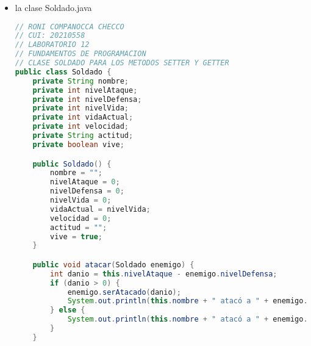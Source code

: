 \documentclass{article}
\begin{document}
\begin{itemize}
\begin{itemize}
\begin{lstlisting}[language=java]
    // METODO QUE NOS AYUDA A ORDENAR LOS SOLDADOS DE ACUERDO A SU NIVEL DE VIDA, USUANDO UN ALGORITMO DE ORDENAMIENTO DE BURBUJA
    public static void ordenarPorVidaMetodoA(ArrayList<Soldado> soldadito) {
        Soldado aux = new Soldado();
        for (int i = 0; i < soldadito.size() - 1; i++) {
            for (int j = 0; j < soldadito.size() - i - 1; j++) {
                if (soldadito.get(j).getNivelVida() < soldadito.get(j + 1).getNivelVida()) {
                    aux = soldadito.get(j);
                    soldadito.set(j, soldadito.get(j + 1));
                    soldadito.set(j + 1, aux);
                }
            }
        }
    }

    // METODO QUE NOS AYUDA A ORDENAR LOS SOLDADOS DE ACUERDO A SU NIVEL DE VIDA, EN ESTA OCACION DIFERENTE A LA ANTERIOR QUE ERA ALGORITMO DE BURBUJA
    public static void ordenarPorVidaMetodoB(ArrayList<Soldado> soldadito) {
        Collections.sort(soldadito, new Comparator<Soldado>() {
            public int compare(Soldado s1, Soldado s2) {
                // Orden descendente por nivel de vida
                return Integer.compare(s2.getNivelVida(), s1.getNivelVida());
            }
        });
    }
}
        \end{lstlisting}

        \item la clase Soldado.java
        \begin{lstlisting}[language=java]
// RONI COMPANOCCA CHECCO
// CUI: 20210558
// LABORATORIO 12
// FUNDAMENTOS DE PROGRAMACION 
// CLASE SOLDADO PARA LOS METODOS SETTER Y GETTER
public class Soldado {
    private String nombre;
    private int nivelAtaque;
    private int nivelDefensa;
    private int nivelVida;
    private int vidaActual;
    private int velocidad;
    private String actitud;
    private boolean vive;

    public Soldado() {
        nombre = "";
        nivelAtaque = 0;
        nivelDefensa = 0;
        nivelVida = 0;
        vidaActual = nivelVida;
        velocidad = 0;
        actitud = "";
        vive = true;
    }

    public void atacar(Soldado enemigo) {
        int danio = this.nivelAtaque - enemigo.nivelDefensa;
        if (danio > 0) {
            enemigo.serAtacado(danio);
            System.out.println(this.nombre + " atacó a " + enemigo.nombre + " y le causó " + danio + " de daño.");
        } else {
            System.out.println(this.nombre + " atacó a " + enemigo.nombre + " pero no le causó daño.");
        }
    }


\end{lstlisting}
\end{itemize}
\end{itemize}
\end{document}
